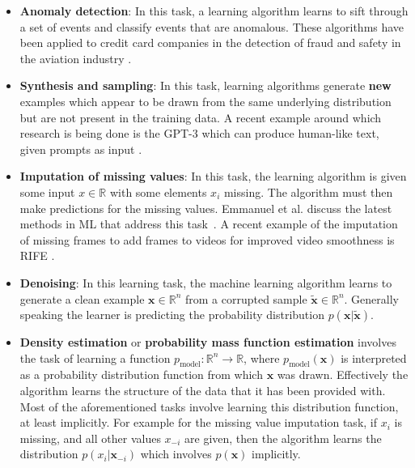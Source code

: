 \begin{itemize}
    \item \textbf{Anomaly detection}: In this task, a learning algorithm learns to sift through a set of events and classify events that are anomalous. These algorithms have been applied to credit card companies in the detection of fraud \cite{Tiwari2021} and safety in the aviation industry \cite{Janakiraman2016, Basora2019}.
    \item \textbf{Synthesis and sampling}: In this task, learning algorithms generate \textbf{new} examples which appear to be drawn from the same underlying distribution but are not present in the training data. A recent example around which research is being done is the \gls{GPT-3} which can produce human-like text, given prompts as input \cite{Brown2020}.
    \item \textbf{Imputation of missing values}: In this task, the learning algorithm is given some input $x\in\mathbb{R}$ with some elements $x_i$ missing. The algorithm must then make predictions for the missing values. Emmanuel et al. discuss the latest methods in \gls{ML} that address this task~\cite{Emmanuel2021}. A recent example of the imputation of missing frames to add frames to videos for improved video smoothness is \gls{RIFE} \cite{huang2020rife}.
    \item \textbf{Denoising}: In this learning task, the machine learning algorithm learns to generate a clean example $\mathbf{x}\in\mathbb{R}^n$ from a corrupted sample $\tilde{\mathbf{x}}\in\mathbb{R}^n$. Generally speaking the learner is predicting the probability distribution $p(\mathbf{x}|\tilde{\mathbf{x}})$.
    \item \textbf{Density estimation} or \textbf{probability mass function estimation} involves the task of learning a function $p_\text{model}:\mathbb{R}^n\rightarrow{}\mathbb{R}$, where $p_\text{model}(\mathbf{x})$ is interpreted as a probability distribution function from which $\mathbf{x}$ was drawn. Effectively the algorithm learns the structure of the data that it has been provided with. Most of the aforementioned tasks involve learning this distribution function, at least implicitly. For example for the missing value imputation task, if $x_i$ is missing, and all other values $x_{-i}$ are given, then the algorithm learns the distribution $p(x_i|\mathbf{x}_{-i})$ which involves $p(\mathbf{x})$ implicitly.
\end{itemize}

